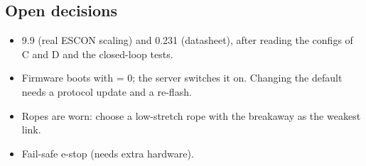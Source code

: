 \subsection{Open decisions}
\begin{itemize}
\item {} 9.9 (real ESCON scaling) and  0.231 (datasheet), after reading the configs of
C and D and the closed-loop tests.
\item Firmware boots with  = 0; the server switches it on. Changing the default needs a protocol
update and a re-flash.
\item Ropes are worn: choose a low-stretch rope with the breakaway as the weakest link.
\item Fail-safe e-stop (needs extra hardware).
\end{itemize}
